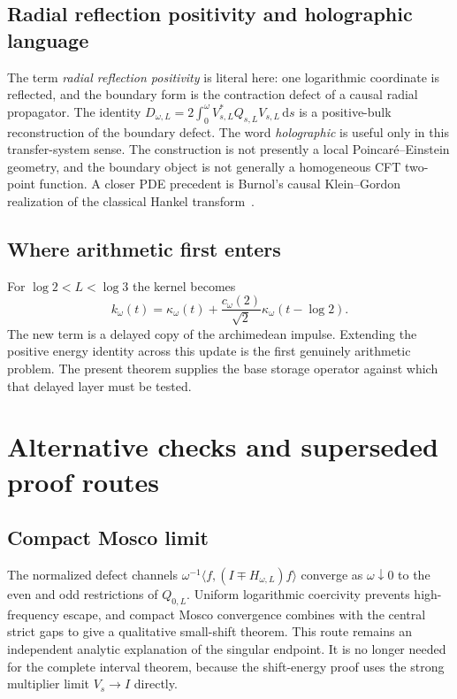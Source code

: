 \documentclass[11pt,a4paper]{article}
\newcommand{\dd}{\,\mathrm d}
\theoremstyle{plain}
\theoremstyle{definition}
\numberwithin{equation}{section}
\begin{document}
\subsection{Radial reflection positivity and holographic language}

The term \emph{radial reflection positivity} is literal here: one logarithmic
coordinate is reflected, and the boundary form is the contraction defect of a
causal radial propagator. The identity
$D_{\omega,L}=2\int_0^\omega V_{s,L}^{*}Q_{s,L}V_{s,L}\dd s$ is a positive-bulk
reconstruction of the boundary defect. The word \emph{holographic} is useful
only in this transfer-system sense. The construction is not presently a local
Poincar\'e--Einstein geometry, and the boundary object is not generally a
homogeneous CFT two-point function. A closer PDE precedent is Burnol's causal
Klein--Gordon realization of the classical Hankel transform~\cite{Burnol2005}.

\subsection{Where arithmetic first enters}

For $\log2<L<\log3$ the kernel becomes
\begin{equation}
k_\omega(t)=\kappa_\omega(t)+\frac{c_\omega(2)}{\sqrt2}\kappa_\omega(t-\log2).
\end{equation}
The new term is a delayed copy of the archimedean impulse. Extending the
positive energy identity across this update is the first genuinely arithmetic
problem. The present theorem supplies the base storage operator against which
that delayed layer must be tested.

\section{Alternative checks and superseded proof routes}

\subsection{Compact Mosco limit}

The normalized defect channels $\omega^{-1}\langle f,(I\mp H_{\omega,L})f\rangle$
converge as $\omega\downarrow0$ to the even and odd restrictions of $Q_{0,L}$.
Uniform logarithmic coercivity prevents high-frequency escape, and compact
Mosco convergence combines with the central strict gaps to give a qualitative
small-shift theorem. This route remains an independent analytic explanation
of the singular endpoint. It is no longer needed for the complete interval
theorem, because the shift-energy proof uses the strong multiplier limit
$V_s\to I$ directly.
\end{document}
